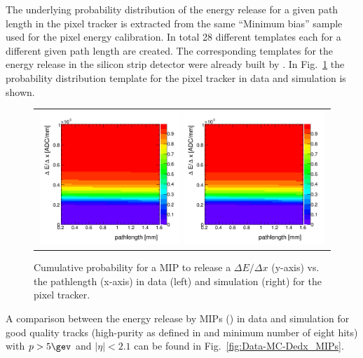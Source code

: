 The underlying probability distribution of the energy release for a given path length in the pixel tracker is extracted from the same ``Minimum bias'' sample used for the pixel energy calibration.
In total 28 different templates each for a different given path length are created.
The corresponding templates for the energy release in the silicon strip detector were already built by  \cite{bib:Quertenmont_2010}.
In Fig.~\ref{fig:ProbabilityTemplate} the probability distribution template for the pixel tracker in data and simulation is shown.
\begin{figure}[!tb]
  \centering 
  \begin{tabular}{c}
    \includegraphics[width=0.49\textwidth]{figures/analysis/Discriminator_template_data_pixel_2012.png}
    \includegraphics[width=0.49\textwidth]{figures/analysis/Discriminator_template_mc_pixel_2012.png}
  \end{tabular}
  \caption{Cumulative probability for a MIP to release a $\Delta E/ \Delta x$ (y-axis) vs. the pathlength (x-axis) in data (left) and simulation (right) for the pixel tracker.}
  \label{fig:ProbabilityTemplate}
\end{figure}
A comparison between the energy release by MIPs (\ias) in data and simulation for good quality tracks (high-purity as defined in \cite{bib:CMS:Tracking_2010} and minimum number of eight hits) with $p>5\gev$ and $|\eta|<2.1$ can be found in Fig.~\ref{fig:Data-MC-Dedx_MIPs}.
